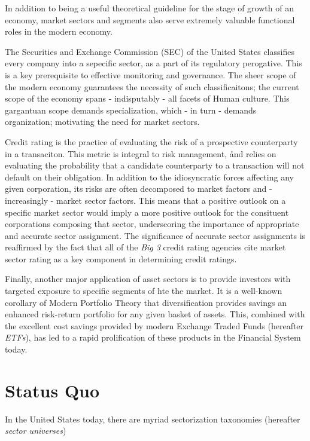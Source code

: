 \documentclass[../main.tex]{subfiles}
\begin{document}
In addition to being a useful theoretical guideline for the stage of growth of an economy, market sectors and segments also serve extremely valuable functional roles in the modern economy.

The Securities and Exchange Commission (SEC) of the United States classifies every company into a sepecific sector, as a part of its regulatory perogative. This is a key prerequisite to effective monitoring and governance. The sheer scope of the modern economy guarantees the necessity of such classificaitons; the current scope of the economy spans - indisputably - all facets of Human culture. This gargantuan scope demands specialization, which - in turn - demands organization; motivating the need for market sectors.

Credit rating is the practice of evaluating the risk of a prospective counterparty in a transaciton. This metric is integral to risk management, ånd relies on evaluating the probability that a candidate counterparty to a transaction will not default on their obligation. In addition to the idiosyncratic forces affecting any given corporation, its risks are often decomposed to market factors and - increasingly - market sector factors. This means that a positive outlook on a specific market sector would imply a more positive outlook for the consituent corporations composing that sector, underscoring the importance of appropriate and accurate sector assignment. The significance of accurate sector assignments is reaffirmed by the fact that all of the \textit{Big 3} credit rating agencies cite market sector rating as a key component in determining credit ratings.

Finally, another major application of asset sectors is to provide investors with targeted exposure to specific segments of hte the market. It is a well-known corollary of Modern Portfolio Theory that diversification provides savings an enhanced risk-return portfolio for any given basket of assets. This, combined with the excellent cost savings provided by modern Exchange Traded Funds (hereafter \textit{ETFs}), has led to a rapid prolification of these products in the Financial System today.

\section{Status Quo}

In the United States today, there are myriad sectorization taxonomies (hereafter \textit{sector universes})
\end{document}
